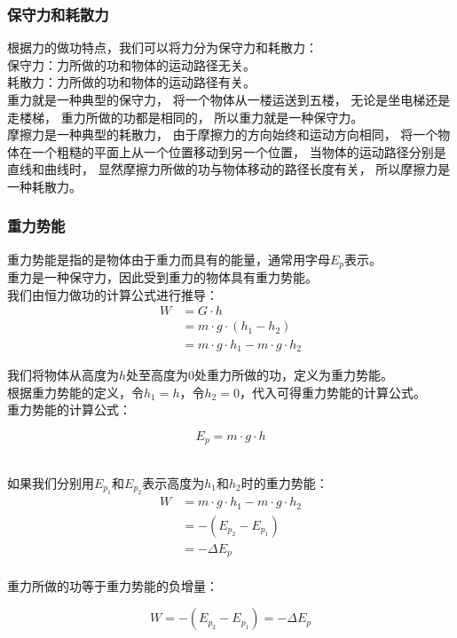 \documentclass[UTF8]{ctexart}
\begin{document}
\subsubsection{保守力和耗散力}
    根据力的做功特点，我们可以将力分为保守力和耗散力：\\[3mm]
    保守力：力所做的功和物体的运动路径无关。\\[2mm]
    耗散力：力所做的功和物体的运动路径有关。\\[4mm]
    重力就是一种典型的保守力，
    将一个物体从一楼运送到五楼，
    无论是坐电梯还是走楼梯，
    重力所做的功都是相同的，
    所以重力就是一种保守力。\\[3mm]
    摩擦力是一种典型的耗散力，
    由于摩擦力的方向始终和运动方向相同，
    将一个物体在一个粗糙的平面上从一个位置移动到另一个位置，
    当物体的运动路径分别是直线和曲线时，
    显然摩擦力所做的功与物体移动的路径长度有关，
    所以摩擦力是一种耗散力。\\

\subsubsection{重力势能}
    重力势能是指的是物体由于重力而具有的能量，通常用字母$E_p$表示。\\[2mm]
    重力是一种保守力，因此受到重力的物体具有重力势能。\\[4mm]
    我们由恒力做功的计算公式进行推导：
    \setcounter{equation}{0}
    \begin{align}
        W
        &=G\cdot h\\[3mm]
        &=m\cdot g\cdot (h_1-h_2)\\[3mm]
        &=m\cdot g\cdot h_1-m\cdot g\cdot h_2
    \end{align}

\newpage

    我们将物体从高度为$h$处至高度为$0$处重力所做的功，定义为重力势能。\\[3mm]
    根据重力势能的定义，令$h_1=h$，令$h_2=0$，代入可得重力势能的计算公式。\\[5mm]
    重力势能的计算公式：
    \begin{large}
        \begin{equation*}
            E_p=m\cdot g\cdot h
        \end{equation*}
    \end{large}\\
    如果我们分别用$E_{p_1}$和$E_{p_2}$表示高度为$h_1$和$h_2$时的重力势能：\vspace{5pt}
    \begin{align}
        W
        &=m\cdot g\cdot h_1-m\cdot g\cdot h_2\\[3mm]
        &=-(E_{p_2}-E_{p_1})\\[3mm]
        &=-\Delta E_p
    \end{align}\\
    重力所做的功等于重力势能的负增量：
    \begin{large}
        \begin{equation*}
            W=-(E_{p_2}-E_{p_1})=-\Delta E_p
        \end{equation*}
    \end{large}
\end{document}
